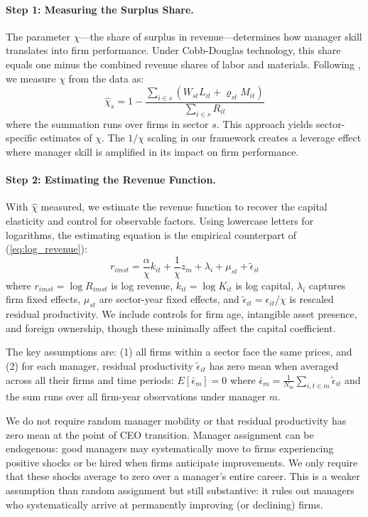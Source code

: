 \documentclass[11pt,a4paper]{article}
\begin{document}
\paragraph{Step 1: Measuring the Surplus Share.} The parameter $\chi$---the share of surplus in revenue---determines how manager skill translates into firm performance. Under Cobb-Douglas technology, this share equals one minus the combined revenue shares of labor and materials. Following \citet{Gandhi2020-nu}, we measure $\chi$ from the data as:
\begin{equation}
\hat{\chi}_s = 1 - \frac{\sum_{i \in s}(W_{st}L_{it} + \varrho_{st}M_{it})}{\sum_{i \in s} R_{it}}
\end{equation}
where the summation runs over firms in sector $s$. This approach yields sector-specific estimates of $\chi$. The $1/\chi$ scaling in our framework creates a leverage effect where manager skill is amplified in its impact on firm performance.

\paragraph{Step 2: Estimating the Revenue Function.} With $\hat{\chi}$ measured, we estimate the revenue function to recover the capital elasticity and control for observable factors. Using lowercase letters for logarithms, the estimating equation is the empirical counterpart of (\ref{eq:log_revenue}):
\begin{equation}
r_{imst} = \frac{\alpha}{\chi} k_{it} + \frac{1}{\chi}z_m + \lambda_i + \mu_{st} + \tilde{\epsilon}_{it}
\end{equation}
where $r_{imst} = \log R_{imst}$ is log revenue, $k_{it} = \log K_{it}$ is log capital, $\lambda_i$ captures firm fixed effects, $\mu_{st}$ are sector-year fixed effects, and $\tilde{\epsilon}_{it} = \epsilon_{it}/\chi$ is rescaled residual productivity. We include controls for firm age, intangible asset presence, and foreign ownership, though these minimally affect the capital coefficient.

The key assumptions are: (1) all firms within a sector face the same prices, and (2) for each manager, residual productivity $\tilde{\epsilon}_{it}$ has zero mean when averaged across all their firms and time periods: $E[\bar{\epsilon}_m] = 0$ where $\bar{\epsilon}_m = \frac{1}{N_m}\sum_{i,t \in m} \tilde{\epsilon}_{it}$ and the sum runs over all firm-year observations under manager $m$.

We do not require random manager mobility or that residual productivity has zero mean at the point of CEO transition. Manager assignment can be endogenous: good managers may systematically move to firms experiencing positive shocks or be hired when firms anticipate improvements. We only require that these shocks average to zero over a manager's entire career. This is a weaker assumption than random assignment but still substantive: it rules out managers who systematically arrive at permanently improving (or declining) firms.
\end{document}
